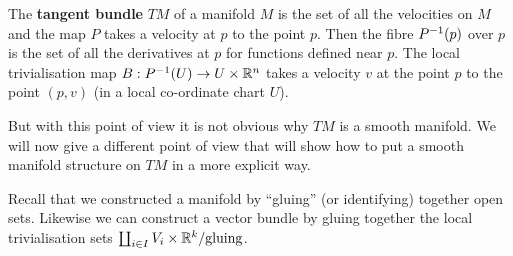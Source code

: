 \begin{defn}
  The \textbf{tangent bundle} $TM$ of a manifold $M$ is the set of all the velocities on $M$ and the map $P$ takes a velocity at $p$ to the point $p$.
  Then the fibre $P^{-1}(p)$ over $p$ is the set of all the derivatives at $p$ for functions defined near $p$.
  The local trivialisation map $B: P^{-1}(U) \to U \times \mathbb{R}^n$ takes a velocity $v$ at the point $p$ to the point $(p,v)$ (in a local co-ordinate chart $U$).
\end{defn}

But with this point of view it is not obvious why $TM$ is a smooth manifold.
We will now give a different point of view that will show how to put a smooth manifold structure on $TM$ in a more explicit way.

Recall that we constructed a manifold by ``gluing'' (or identifying) together open sets.
Likewise we can construct a vector bundle by gluing together the local trivialisation sets $\coprod_{i \in I} V_i \times \mathbb{R}^k / \text{gluing}$.

